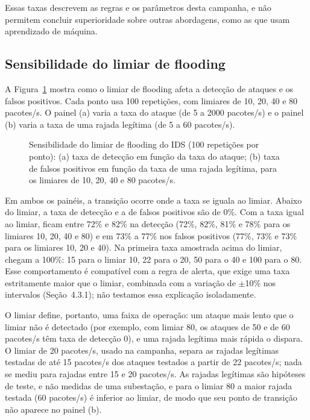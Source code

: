 \documentclass[12pt]{article}
\begin{document}
Essas taxas descrevem as regras e os parâmetros desta campanha, e não permitem concluir superioridade sobre outras abordagens, como as que usam aprendizado de máquina.

\subsection{Sensibilidade do limiar de flooding}\label{sec:6.2}

A Figura~\ref{fig:7} mostra como o limiar de flooding afeta a detecção de ataques e os falsos positivos. Cada ponto usa 100 repetições, com limiares de 10, 20, 40 e 80 pacotes/s. O painel (a) varia a taxa do ataque (de 5 a 2000 pacotes/s) e o painel (b) varia a taxa de uma rajada legítima (de 5 a 60 pacotes/s).

\begin{figure}[!t]
\centering

\caption{Sensibilidade do limiar de flooding do IDS (100 repetições por ponto): (a) taxa de detecção em função da taxa do ataque; (b) taxa de falsos positivos em função da taxa de uma rajada legítima, para os limiares de 10, 20, 40 e 80 pacotes/s.}\label{fig:7}
\end{figure}

Em ambos os painéis, a transição ocorre onde a taxa se iguala ao limiar. Abaixo do limiar, a taxa de detecção e a de falsos positivos são de 0\%. Com a taxa igual ao limiar, ficam entre 72\% e 82\% na detecção (72\%, 82\%, 81\% e 78\% para os limiares 10, 20, 40 e 80) e em 73\% a 77\% nos falsos positivos (77\%, 73\% e 73\% para os limiares 10, 20 e 40). Na primeira taxa amostrada acima do limiar, chegam a 100\%: 15 para o limiar 10, 22 para o 20, 50 para o 40 e 100 para o 80. Esse comportamento é compatível com a regra de alerta, que exige uma taxa estritamente maior que o limiar, combinada com a variação de \ensuremath{\pm}10\% nos intervalos (Seção~4.3.1); não testamos essa explicação isoladamente.

O limiar define, portanto, uma faixa de operação: um ataque mais lento que o limiar não é detectado (por exemplo, com limiar 80, os ataques de 50 e de 60 pacotes/s têm taxa de detecção 0), e uma rajada legítima mais rápida o dispara. O limiar de 20 pacotes/s, usado na campanha, separa as rajadas legítimas testadas de até 15 pacotes/s dos ataques testados a partir de 22 pacotes/s; nada se mediu para rajadas entre 15 e 20 pacotes/s. As rajadas legítimas são hipóteses de teste, e não medidas de uma subestação, e para o limiar 80 a maior rajada testada (60 pacotes/s) é inferior ao limiar, de modo que seu ponto de transição não aparece no painel (b).
\end{document}

